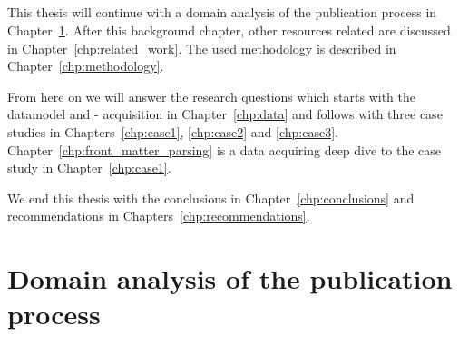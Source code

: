 \documentclass{ou-report}
\newcommand{\outline}[1]{{\color{blue} #1}}
\begin{document}
    

\paragraph{}
This thesis will continue with a domain analysis of the publication process in
Chapter~\ref{chp:domainanalysis}. After this background chapter, other 
resources related are discussed in Chapter~\ref{chp:related_work}. The used
methodology is described in Chapter~\ref{chp:methodology}. 

From here on we will
answer the research questions which starts with the datamodel and - acquisition
in Chapter~\ref{chp:data} and follows with three case studies in 
Chapters~\ref{chp:case1}, \ref{chp:case2} and \ref{chp:case3}. 
Chapter~\ref{chp:front_matter_parsing} is a data acquiring deep dive to the case 
study in Chapter~\ref{chp:case1}.

We end this thesis with the conclusions in Chapter~\ref{chp:conclusions} and
recommendations in Chapters~\ref{chp:recommendations}.



\chapter{Domain analysis of the publication process}
\label{chp:domainanalysis}
\end{document}
